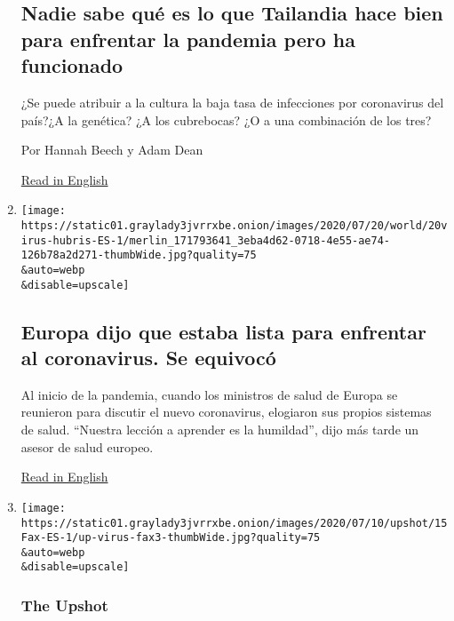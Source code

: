 \begin{enumerate}
{  \subsection{Nadie sabe qué es lo que Tailandia hace bien para
  enfrentar la pandemia pero ha
  funcionado}\label{nadie-sabe-quuxe9-es-lo-que-tailandia-hace-bien-para-enfrentar-la-pandemia-pero-ha-funcionado}}

  ¿Se puede atribuir a la cultura la baja tasa de infecciones por
  coronavirus del país?¿A la genética? ¿A los cubrebocas? ¿O a una
  combinación de los tres?

  Por Hannah Beech y Adam Dean

  \href{https://www.nytimes3xbfgragh.onion/2020/07/16/world/asia/coronavirus-thailand-photos.html}{Read
  in English}
\item
  \href{/es/2020/07/21/espanol/mundo/errores-europa-coronavirus.html}{}

  \texttt{[image: https://static01.graylady3jvrrxbe.onion/images/2020/07/20/world/20virus-hubris-ES-1/merlin\_171793641\_3eba4d62-0718-4e55-ae74-126b78a2d271-thumbWide.jpg?quality=75\\\&auto=webp\\\&disable=upscale]}

  \hypertarget{europa-dijo-que-estaba-lista-para-enfrentar-al-coronavirus-se-equivocuxf3}{%
  \subsection{Europa dijo que estaba lista para enfrentar al
  coronavirus. Se
  equivocó}\label{europa-dijo-que-estaba-lista-para-enfrentar-al-coronavirus-se-equivocuxf3}}

  Al inicio de la pandemia, cuando los ministros de salud de Europa se
  reunieron para discutir el nuevo coronavirus, elogiaron sus propios
  sistemas de salud. ``Nuestra lección a aprender es la humildad'', dijo
  más tarde un asesor de salud europeo.

  \href{https://www.nytimes3xbfgragh.onion/2020/07/20/world/europe/coronavirus-mistakes-france-uk-italy.html}{Read
  in English}
\item
  \href{/es/2020/07/15/espanol/mundo/coronavirus-sistema-salud-publica.html}{}

  \texttt{[image: https://static01.graylady3jvrrxbe.onion/images/2020/07/10/upshot/15Fax-ES-1/up-virus-fax3-thumbWide.jpg?quality=75\\\&auto=webp\\\&disable=upscale]}

  \hypertarget{the-upshot}{%
  \subsubsection{The Upshot}\label{the-upshot}}


\end{enumerate}
